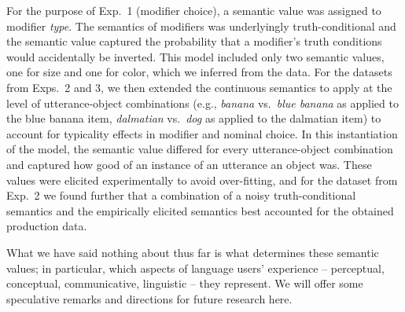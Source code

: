 \documentclass[11pt]{article}
\newcommand{\tableref}[1]{Table \ref{#1}}
\begin{document}
For the purpose of Exp.~1 (modifier choice), a semantic value was assigned to modifier \emph{type}. The semantics of modifiers was underlyingly truth-conditional and the semantic value captured the probability that a modifier's truth conditions would accidentally be inverted. This model included only two semantic values, one for size and one for color, which we inferred from the data. For the datasets from Exps.~2 and 3, we then extended the continuous semantics to apply at the level of utterance-object  combinations (e.g., \emph{banana} vs.~\emph{blue banana} as applied to the blue banana item, \emph{dalmatian} vs.~\emph{dog} as applied to the dalmatian item) to account for typicality effects in modifier and nominal choice. In this instantiation of the model, the semantic value differed for every utterance-object combination and captured how good of an instance of an utterance an object was. These values were elicited experimentally to avoid over-fitting, and for the dataset from Exp.~2 we found further that a combination of a noisy truth-conditional semantics and the empirically elicited semantics best accounted for the obtained production data. %


What we have said nothing about thus far is what determines these semantic values; in particular, which aspects of language users' experience -- perceptual, conceptual, communicative, linguistic -- they represent. We will offer some speculative remarks and directions for future research here. 
\end{document}
